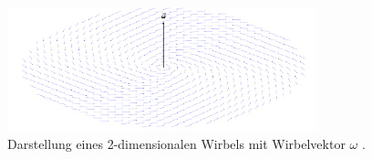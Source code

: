 \begin{figure}
\centering
\includegraphics[width=0.8\textwidth]{papers/wirbelringe/fig/flacher_wirbel.pdf}
\caption{Darstellung eines 2-dimensionalen Wirbels mit Wirbelvektor \(\omega\) \label{Wirbelringe:fig:flacher_wirbel}.}
\end{figure}